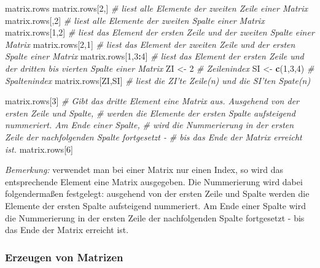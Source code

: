 \documentclass[]{article}
\newenvironment{Shaded}{\begin{snugshade}}{\end{snugshade}}
\newcommand{\KeywordTok}[1]{\textcolor[rgb]{0.13,0.29,0.53}{\textbf{#1}}}
\newcommand{\DecValTok}[1]{\textcolor[rgb]{0.00,0.00,0.81}{#1}}
\newcommand{\StringTok}[1]{\textcolor[rgb]{0.31,0.60,0.02}{#1}}
\newcommand{\CommentTok}[1]{\textcolor[rgb]{0.56,0.35,0.01}{\textit{#1}}}
\newcommand{\OperatorTok}[1]{\textcolor[rgb]{0.81,0.36,0.00}{\textbf{#1}}}
\newcommand{\NormalTok}[1]{#1}
\begin{document}
\begin{Shaded}
\begin{Highlighting}[]
\NormalTok{    matrix.rows}
\NormalTok{    matrix.rows[}\DecValTok{2}\NormalTok{,]    }\CommentTok{# liest alle Elemente der zweiten Zeile einer Matrix}
\NormalTok{    matrix.rows[,}\DecValTok{2}\NormalTok{]    }\CommentTok{# liest alle Elemente der zweiten Spalte einer Matrix}
\NormalTok{    matrix.rows[}\DecValTok{1}\NormalTok{,}\DecValTok{2}\NormalTok{]   }\CommentTok{# liest das Element der ersten Zeile und der zweiten Spalte einer Matrix}
\NormalTok{    matrix.rows[}\DecValTok{2}\NormalTok{,}\DecValTok{1}\NormalTok{]   }\CommentTok{# liest das Element der zweiten Zeile und der ersten Spalte einer Matrix}
\NormalTok{    matrix.rows[}\DecValTok{1}\NormalTok{,}\DecValTok{3}\OperatorTok{:}\DecValTok{4}\NormalTok{] }\CommentTok{# liest das Element der ersten Zeile und der dritten bis vierten Spalte einer Matrix}
\NormalTok{    ZI <-}\StringTok{ }\DecValTok{2}            \CommentTok{# Zeilenindex}
\NormalTok{    SI <-}\StringTok{ }\KeywordTok{c}\NormalTok{(}\DecValTok{1}\NormalTok{,}\DecValTok{3}\NormalTok{,}\DecValTok{4}\NormalTok{)     }\CommentTok{# Spaltenindex}
\NormalTok{    matrix.rows[ZI,SI] }\CommentTok{# liest die ZI'te Zeile(n) und die SI'ten Spate(n)}
    
\NormalTok{    matrix.rows[}\DecValTok{3}\NormalTok{]     }\CommentTok{# Gibt das dritte Element eine Matrix aus. Ausgehend von der ersten Zeile und Spalte,}
                       \CommentTok{# werden die Elemente der ersten Spalte aufsteigend nummeriert. Am Ende einer Spalte,}
                       \CommentTok{# wird die Nummerierung in der ersten Zeile der nachfolgenden Spalte fortgesetzt - }
                       \CommentTok{# bis das Ende der Matrix erreicht ist.}
\NormalTok{    matrix.rows[}\DecValTok{6}\NormalTok{]}
\end{Highlighting}
\end{Shaded}

\emph{Bemerkung:} verwendet man bei einer Matrix nur einen Index, so
wird das entsprechende Element eine Matrix ausgegeben. Die Nummerierung
wird dabei folgendermaßen festgelegt: ausgehend von der ersten Zeile und
Spalte werden die Elemente der ersten Spalte aufsteigend nummeriert. Am
Ende einer Spalte wird die Nummerierung in der ersten Zeile der
nachfolgenden Spalte fortgesetzt - bis das Ende der Matrix erreicht ist.

\subsubsection*{Erzeugen von Matrizen}\label{erzeugen-von-matrizen}
\end{document}
